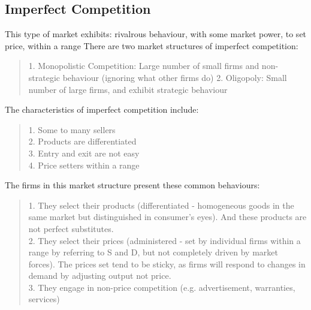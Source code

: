 \subsection{Imperfect Competition}
This type of market exhibits: rivalrous behaviour, with some market power, to set price, within a range
There are two market structures of imperfect competition:
\begin{quote}
    1. Monopolistic Competition: Large number of small firms and non-strategic behaviour (ignoring what other firms do)
    2. Oligopoly: Small number of large firms, and exhibit strategic behaviour
\end{quote}
The characteristics of imperfect competition include:
\begin{quote}
    1. Some to many sellers \\
    2. Products are differentiated \\
    3. Entry and exit are not easy \\
    4. Price setters within a range
\end{quote}
The firms in this market structure present these common behaviours:
\begin{quote}
    1. They select their products (differentiated - homogeneous goods in the same market but distinguished in consumer's eyes). And these products are not perfect substitutes. \\
    2. They select their prices (administered - set by individual firms within a range by referring to S and D, but not completely driven by market forces). The prices set tend to be sticky, as firms will respond to changes in demand by adjusting output not price. \\
    3. They engage in non-price competition (e.g. advertisement, warranties, services)
\end{quote}

